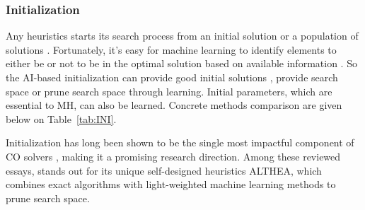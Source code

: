 \documentclass[a4paper]{article}
\begin{document}
\begin{table}[h]
\centering
\caption{Methods on algorithm scheduling}\label{tab:AS}
\end{table}

\subsubsection{Initialization}

Any heuristics starts its search process from an initial solution or a population of solutions \citep{Maryam}. Fortunately, it's easy for machine learning to identify elements to either be or not to be in the optimal solution based on available information \citep{Juho}. So the AI-based initialization can provide good initial solutions \citep{Jiwei}, provide search space or prune search space \citep{Xin,Congsong,Juho,Jiwei} through learning. Initial parameters, which are essential to MH, can also be learned. Concrete methods comparison are given below on Table~\ref{tab:INI}.

Initialization has long been shown to be the single most impactful component of CO solvers \citep{Achterberg}, making it a promising research direction. Among these reviewed essays, \citet{Juho} stands out for its unique self-designed heuristics ALTHEA, which combines exact algorithms with light-weighted machine learning methods to prune search space.
\end{document}
